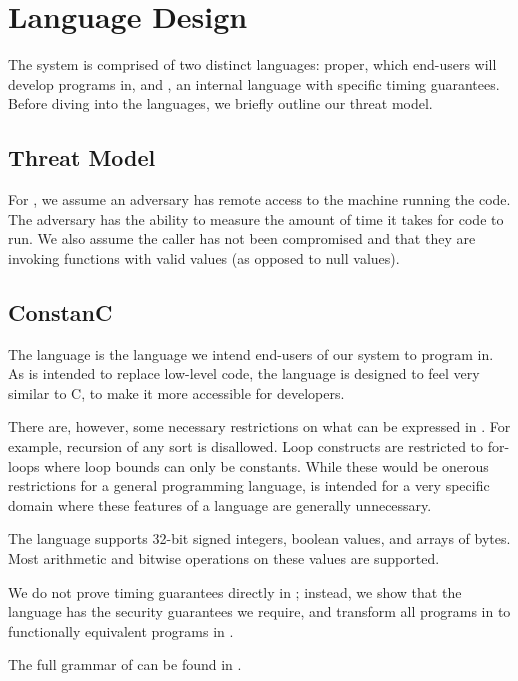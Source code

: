 \section{Language Design}
\label{sec:design}

The \constc system is comprised of two distinct languages: \constc proper, which end-users
will develop programs in, and \ccore, an internal language with specific timing guarantees. Before diving into the languages, we briefly outline our threat model.

\subsection{Threat Model}
For \constc, we assume an adversary has remote access to the machine running the code. The adversary has the ability to measure the amount of time it takes for \constc code to run. We also assume the caller has not been compromised and that they are invoking \constc functions with valid values (as opposed to null values).

\subsection{ConstanC}

The \constc language is the language we intend end-users of our system to program in.
As \constc is intended to replace low-level code, the language is designed to
feel very similar to C, to make it more accessible for developers.

There are, however, some necessary restrictions on what can be expressed in \constc.
For example, recursion of any sort is disallowed. Loop constructs are restricted to
for-loops where loop bounds can only be constants. While these would be onerous restrictions for a general
programming language, \constc is intended for a very specific domain where these
features of a language are generally unnecessary.

The language supports 32-bit signed integers, boolean values, and arrays of bytes.
Most arithmetic and bitwise operations on these values are supported.

We do not prove timing guarantees directly in \constc; instead, we show
that the \ccore language has the security guarantees we require, and transform all programs
in \constc to functionally equivalent programs in \ccore.

The full grammar of \constc can be found in .

